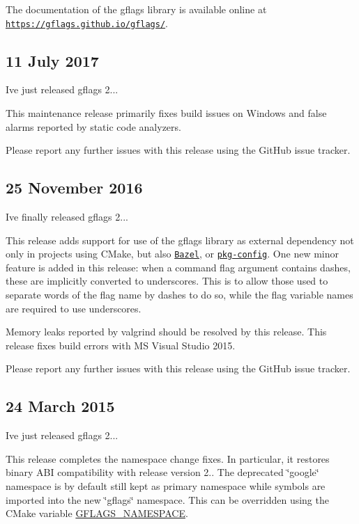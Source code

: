 \href{https://travis-ci.org/gflags/gflags}{\tt } \href{https://ci.appveyor.com/project/schuhschuh/gflags/branch/master}{\tt }

The documentation of the gflags library is available online at \href{https://gflags.github.io/gflags/}{\tt https\+://gflags.\+github.\+io/gflags/}.

\subsection*{11 July 2017 }

I\textquotesingle{}ve just released gflags 2...

This maintenance release primarily fixes build issues on Windows and false alarms reported by static code analyzers.

Please report any further issues with this release using the Git\+Hub issue tracker.

\subsection*{25 November 2016 }

I\textquotesingle{}ve finally released gflags 2...

This release adds support for use of the gflags library as external dependency not only in projects using C\+Make, but also \href{https://bazel.build/}{\tt Bazel}, or \href{https://www.freedesktop.org/wiki/Software/pkg-config/}{\tt pkg-\/config}. One new minor feature is added in this release\+: when a command flag argument contains dashes, these are implicitly converted to underscores. This is to allow those used to separate words of the flag name by dashes to do so, while the flag variable names are required to use underscores.

Memory leaks reported by valgrind should be resolved by this release. This release fixes build errors with MS Visual Studio 2015.

Please report any further issues with this release using the Git\+Hub issue tracker.

\subsection*{24 March 2015 }

I\textquotesingle{}ve just released gflags 2...

This release completes the namespace change fixes. In particular, it restores binary A\+BI compatibility with release version 2.. The deprecated \char`\"{}google\char`\"{} namespace is by default still kept as primary namespace while symbols are imported into the new \char`\"{}gflags\char`\"{} namespace. This can be overridden using the C\+Make variable \hyperlink{namespaceGFLAGS__NAMESPACE}{G\+F\+L\+A\+G\+S\+\_\+\+N\+A\+M\+E\+S\+P\+A\+CE}.

